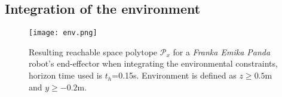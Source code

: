 





\vspace{-0.2cm}
\subsection{Integration of the environment}

\begin{figure}[!t]
    \centering
    \texttt{[image: env.png]}
    \caption{Resulting reachable space polytope $\mathcal{P}_x$ for a \textit{Franka Emika Panda} robot's end-effector when integrating the environmental constraints, horizon time used is $t_h$=0.15s. Environment is defined as $z\geq0.5$m and $y\geq-0.2$m.}
    \label{fig:env}
    \vspace{-0.5cm}
\end{figure}

